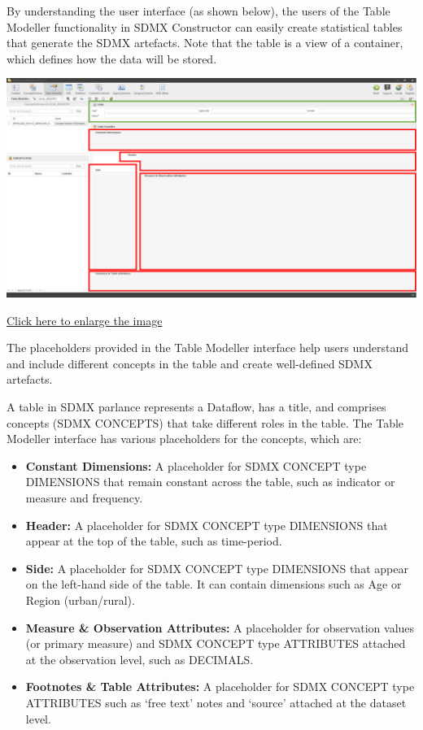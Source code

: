 \documentclass[
]{book}
\begin{document}
By understanding the user interface (as shown below), the users of the Table Modeller functionality in SDMX Constructor can easily create statistical tables that generate the SDMX artefacts. Note that the table is a view of a container, which defines how the data will be stored.

\begin{center}\includegraphics[width=1\linewidth]{./images/image234} \end{center}

\href{images/image234.png}{Click here to enlarge the image}

The placeholders provided in the Table Modeller interface help users understand and include different concepts in the table and create well-defined SDMX artefacts.

A table in SDMX parlance represents a Dataflow, has a title, and comprises concepts (SDMX CONCEPTS) that take different roles in the table. The Table Modeller interface has various placeholders for the concepts, which are:

\begin{itemize}
\item
  \textbf{Constant Dimensions:} A placeholder for SDMX CONCEPT type DIMENSIONS that remain constant across the table, such as indicator or measure and frequency.
\item
  \textbf{Header:} A placeholder for SDMX CONCEPT type DIMENSIONS that appear at the top of the table, such as time-period.
\item
  \textbf{Side:} A placeholder for SDMX CONCEPT type DIMENSIONS that appear on the left-hand side of the table. It can contain dimensions such as Age or Region (urban/rural).
\item
  \textbf{Measure \& Observation Attributes:} A placeholder for observation values (or primary measure) and SDMX CONCEPT type ATTRIBUTES attached at the observation level, such as DECIMALS.
\item
  \textbf{Footnotes \& Table Attributes:} A placeholder for SDMX CONCEPT type ATTRIBUTES such as `free text' notes and `source' attached at the dataset level.
\end{itemize}
\end{document}
